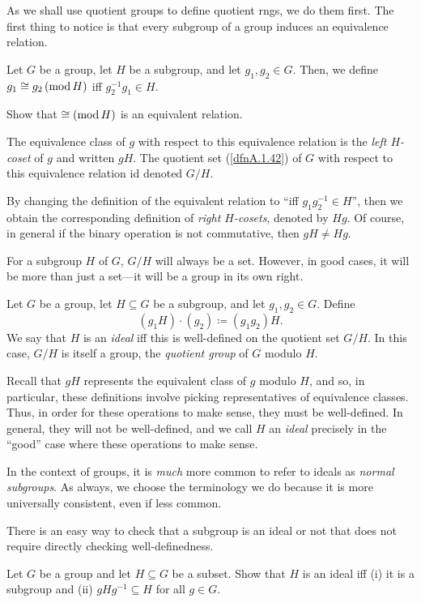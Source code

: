As we shall use quotient groups to define quotient rngs, we do them first.  The first thing to notice is that every subgroup of a group induces an equivalence relation.
\begin{dfn}\label{Cosets}
Let $G$ be a group, let $H$ be a subgroup, and let $g_1,g_2\in G$.  Then, we define $g_1\cong g_2\left( \mathrm{mod}\, H\right)$ iff $g_2^{-1}g_1\in H$.
\begin{exr}
Show that $\cong \left( \mathrm{mod}\, H\right)$ is an equivalent relation.
\end{exr}
The equivalence class of $g$ with respect to this equivalence relation is the \emph{left $H$-coset} of $g$ and written $gH$.  The quotient set (\cref{dfnA.1.42}) of $G$ with respect to this equivalence relation id denoted $G/H$.
\begin{rmk}
By changing the definition of the equivalent relation to ``\textellipsis iff $g_1g_2^{-1}\in H$'', then we obtain the corresponding definition of \emph{right $H$-cosets}, denoted by $Hg$.  Of course, in general if the binary operation is not commutative, then $gH\neq Hg$.
\end{rmk}
\end{dfn}
For a subgroup $H$ of $G$, $G/H$ will always be a set.  However, in good cases, it will be more than just a set---it will be a group in its own right.
\begin{dfn}\label{IdealsAndQuotientGroups}
Let $G$ be a group, let $H\subseteq G$ be a subgroup, and let $g_1,g_2\in G$.  Define
\begin{equation}
(g_1H)\cdot (g_2)\coloneqq (g_1g_2)H.
\end{equation}
We say that $H$ is an \emph{ideal} iff this is well-defined on the quotient set $G/H$.  In this case, $G/H$ is itself a group, the \emph{quotient group} of $G$ modulo $H$.
\begin{rmk}
Recall that $gH$ represents the equivalent class of $g$ modulo $H$, and so, in particular, these definitions involve picking representatives of equivalence classes.  Thus, in order for these operations to make sense, they must be well-defined.  In general, they will not be well-defined, and we call $H$ an \emph{ideal} precisely in the ``good'' case where these operations to make sense.
\end{rmk}
\begin{rmk}
In the context of groups, it is \emph{much} more common to refer to ideals as \emph{normal subgroups}.  As always, we choose the terminology we do because it is more universally consistent, even if less common.
\end{rmk}
\end{dfn}
There is an easy way to check that a subgroup is an ideal or not that does not require directly checking well-definedness.
\begin{exr}
Let $G$ be a group and let $H\subseteq G$ be a subset.  Show that $H$ is an ideal iff (i) it is a subgroup and (ii) $gHg^{-1}\subseteq H$ for all $g\in G$.
\end{exr}

